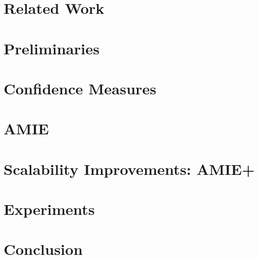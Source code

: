 \section{Related Work}
\label{sec:relatedWork}



\section{Preliminaries}
\label{sec:preliminaries}



% 

\section{Confidence Measures}
\label{sec:pca}



\section{AMIE}
\label{sec:alg}



\section{Scalability Improvements: AMIE+}
\label{sec:improvements}



\section{Experiments}
\label{sec:experiments}



\section{Conclusion}
\label{sec:conclusion}



\balance



